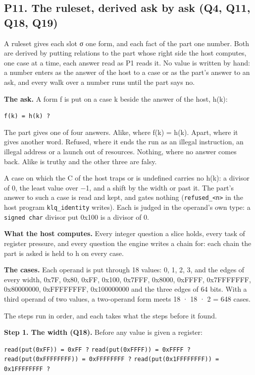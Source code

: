 \subsection{\texorpdfstring{P11. The ruleset, derived ask by ask (Q4, Q11, Q18, Q19)}{P11. The ruleset, derived ask by ask (Q4, Q11, Q18, Q19)}}

A ruleset gives each slot σ one form, and each fact of the part one number. Both are derived by putting relations to the part whose right side the host computes, one case at a time, each answer read as P1 reads it. No value is written by hand: a number enters as the answer of the host to a case or as the part's answer to an ask, and every walk over a number runs until the part says no.

\textbf{The ask.} A form f is put on a case k beside the answer of the host, h(k):

\texttt{f(k) = h(k) ?}

The part gives one of four answers. Alike, where f(k) = h(k). Apart, where it gives another word. Refused, where it ends the run as an illegal instruction, an illegal address or a launch out of resources. Nothing, where no answer comes back. Alike is truthy and the other three are falsy.

A case on which the C of the host traps or is undefined carries no h(k): a divisor of 0, the least value over −1, and a shift by the width or past it. The part's answer to such a case is read and kept, and gates nothing (\texttt{refused\_\allowbreak{}<n>} in the host program \texttt{klq\_\allowbreak{}identity} writes). Each is judged in the operand's own type: a \texttt{signed char} divisor put 0x100 is a divisor of 0.

\textbf{What the host computes.} Every integer question a slice holds, every task of register pressure, and every question the engine writes a chain for: each chain the part is asked is held to h on every case.

\textbf{The cases.} Each operand is put through 18 values: 0, 1, 2, 3, and the edges of every width, 0x7F, 0x80, 0xFF, 0x100, 0x7FFF, 0x8000, 0xFFFF, 0x7FFFFFFF, 0x80000000, 0xFFFFFFFF, 0x100000000 and the three edges of 64 bits. With a third operand of two values, a two-operand form meets 18 · 18 · 2 = 648 cases.

The steps run in order, and each takes what the steps before it found.

\textbf{Step 1. The width (Q18).} Before any value is given a register:

\texttt{read(put(0x\allowbreak{}FF)) = 0x\allowbreak{}FF ?}  \texttt{read(put(0x\allowbreak{}FFFF)) = 0x\allowbreak{}FFFF ?}  \texttt{read(put(0x\allowbreak{}FFFFFFFF)) = 0x\allowbreak{}FFFFFFFF ?}  \texttt{read(put(0x1FFFFFFFF)) = 0x1FFFFFFFF ?}


